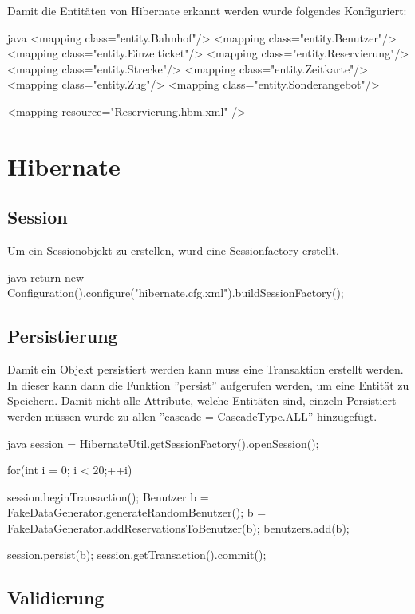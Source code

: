 	Damit die Entitäten von Hibernate erkannt werden wurde folgendes Konfiguriert:
	
	\begin{code}[]{java}
		<mapping class="entity.Bahnhof"/>
		<mapping class="entity.Benutzer"/>
		<mapping class="entity.Einzelticket"/>
		<mapping class="entity.Reservierung"/>
		<mapping class="entity.Strecke"/>
		<mapping class="entity.Zeitkarte"/>
		<mapping class="entity.Zug"/>
		<mapping class="entity.Sonderangebot"/>
		
		<mapping resource="Reservierung.hbm.xml" />
	\end{code}

	\section{Hibernate}
	\subsection{Session}
	Um ein Sessionobjekt zu erstellen, wurd eine Sessionfactory erstellt.
	
	\begin{code}[]{java}
		return new Configuration().configure("hibernate.cfg.xml").buildSessionFactory();
	\end{code}

	\subsection{Persistierung}
	Damit ein Objekt persistiert werden kann muss eine Transaktion erstellt werden. In dieser kann dann die Funktion ''persist'' aufgerufen werden, um eine Entität zu Speichern. 
	Damit nicht alle Attribute, welche Entitäten sind, einzeln Persistiert werden müssen wurde zu allen ''cascade = CascadeType.ALL'' hinzugefügt.
	
	\begin{code}[]{java}
		session = HibernateUtil.getSessionFactory().openSession();
		
		for(int i = 0; i < 20;++i) {
			session.beginTransaction();
			Benutzer b = FakeDataGenerator.generateRandomBenutzer();
			b = FakeDataGenerator.addReservationsToBenutzer(b);
			benutzers.add(b);
			
			session.persist(b);
			session.getTransaction().commit();
		}
	\end{code}


	\subsection{Validierung}
	
